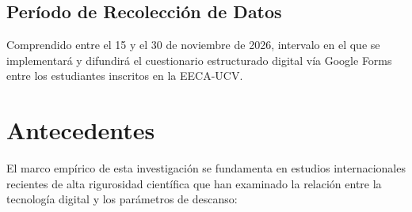 \documentclass[12pt, letterpaper]{article}
\begin{document}
\subsection{Período de Recolección de Datos}
Comprendido entre el 15 y el 30 de noviembre de 2026, intervalo en el que se implementará y difundirá el cuestionario estructurado digital vía Google Forms entre los estudiantes inscritos en la EECA-UCV.


\section{Antecedentes}

El marco empírico de esta investigación se fundamenta en estudios internacionales recientes de alta rigurosidad científica que han examinado la relación entre la tecnología digital y los parámetros de descanso:
\end{document}
